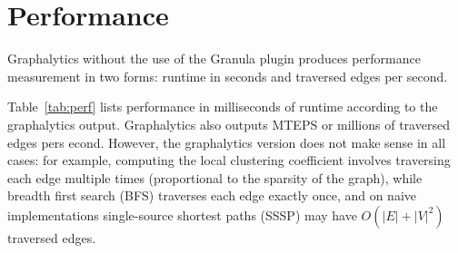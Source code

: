 \documentclass{sig-alternate}
\begin{document}
\begin{table}[!htb]
	\centering

	\caption{Machine specifications. The disparity between the CPU's advertised clock speed and the ``CPU Clock'' row is a result of the Turbo Boost technology which can increase the clock speed to a limit. The manufacturer's published maximum clock speeds can be found at \url{http://ark.intel.com}.}
	\label{tab:specs}
\end{table}


\section{Performance}
Graphalytics without the use of the Granula plugin produces performance measurement in two forms: runtime in seconds and traversed edges per second.

Table~\ref{tab:perf} lists performance in milliseconds of runtime according to the graphalytics output. Graphalytics also outputs MTEPS or millions of traversed edges pers econd. However, the graphalytics version does not make sense in all cases: for example, computing the local clustering coefficient involves traversing each edge multiple times (proportional to the sparsity of the graph), while breadth first search (BFS) traverses each edge exactly once, and on na\:ive implementations single-source shortest paths (SSSP) may have $O(|E| + |V|^2)$ traversed edges.
\end{document}

